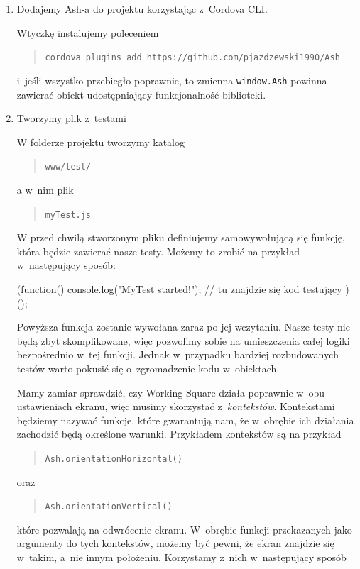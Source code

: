 \documentclass[brudnopis]{xmgr}
\begin{document}
\begin{enumerate}
  \item Dodajemy Ash-a do projektu korzystając z~Cordova CLI.

Wtyczkę instalujemy poleceniem 
\begin{quote}
   \texttt{cordova plugins add https://github.com/pjazdzewski1990/Ash}
\end{quote}
i~jeśli wszystko przebiegło poprawnie, to zmienna \texttt{window.Ash} powinna zawierać obiekt udostępniający funkcjonalność biblioteki.  

 \item Tworzymy plik z~testami

W folderze projektu tworzymy katalog 
\begin{quote}
  \texttt{www/test/}
\end{quote} 
a w~nim plik 
\begin{quote}
  \texttt{myTest.js}
\end{quote} 
W przed chwilą stworzonym pliku definiujemy samowywołującą się funkcję, która będzie zawierać nasze testy. Możemy  to zrobić na przykład w~następujący sposób:

 \begin{javascriptcode}
  (function(){
	console.log("MyTest started!");
	//  tu znajdzie się kod testujący 
  })();
\end{javascriptcode}

Powyższa funkcja zostanie wywołana zaraz po jej wczytaniu. Nasze testy nie będą zbyt skomplikowane, więc pozwolimy sobie na umieszczenia całej logiki bezpośrednio w~tej funkcji. Jednak w~przypadku bardziej rozbudowanych testów warto pokusić się o~zgromadzenie kodu w~obiektach.

Mamy zamiar sprawdzić, czy Working Square działa poprawnie w~obu ustawieniach ekranu, więc musimy skorzystać z~\textit{kontekstów}. Kontekstami będziemy nazywać funkcje, które gwarantują nam, że w~obrębie ich działania zachodzić będą określone warunki. Przykładem kontekstów są na przykład

\begin{quote}
   \texttt{Ash.orientationHorizontal()}
\end{quote}

oraz 

\begin{quote}
   \texttt{Ash.orientationVertical()}
\end{quote}

które pozwalają na odwrócenie ekranu. W~obrębie funkcji przekazanych jako argumenty do tych kontekstów, możemy być pewni, że ekran znajdzie się w~takim, a~nie innym położeniu. Korzystamy z~nich w~następujący sposób


\end{enumerate}
\end{document}
